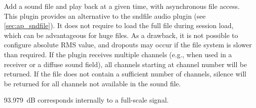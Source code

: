Add a sound file and play back at a given time, with asynchronous file access.
%
This plugin provides an alternative to the sndfile audio plugin
(see \ref{sec:ap_sndfile}). It does not require to load the full
file during session load, which can be advantageous for huge files. As
a drawback, it is not possible to configure absolute RMS value, and
dropouts may occur if the file system is slower than required.
%
If the plugin receives multiple channels (e.g., when used in a
receiver or a diffuse sound field), all channels starting at channel
number  will be returned. If the file does not contain a
sufficient number of channels, silence will be returned for all
channels not available in the sound file.



93.979~dB corresponds internally to a full-scale signal.
